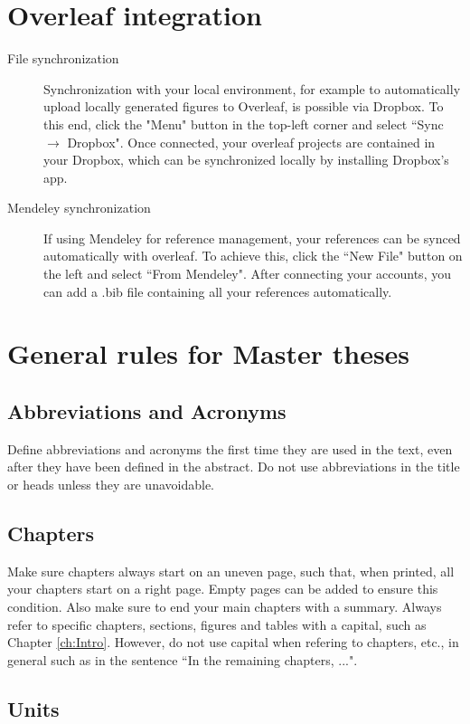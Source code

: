 \documentclass[11pt]{report}
\numberwithin{equation}{chapter}		%
\numberwithin{figure}{chapter}			%
\numberwithin{table}{chapter}			%
\begin{document}
	\section{Overleaf integration}
	\begin{description}
	\item[File synchronization] Synchronization with your local environment, for example to automatically upload locally generated figures to Overleaf, is possible via Dropbox. To this end, click the "Menu" button in the top-left corner and select ``Sync $\rightarrow$ Dropbox". Once connected, your overleaf projects are contained in your Dropbox, which can be synchronized locally by installing Dropbox's app.
	\item[Mendeley synchronization] If using Mendeley for reference management, your references can be synced automatically with overleaf. To achieve this, click the ``New File" button on the left and select ``From Mendeley". After connecting your accounts, you can add a .bib file containing all your references automatically.
	\end{description}


	\section{General rules for Master theses}
	\subsection{Abbreviations and Acronyms} Define abbreviations and acronyms the first time they are used in the text, even after they have been defined in the abstract. Do not use abbreviations in the title or heads unless they are unavoidable.

	\subsection{Chapters}
	Make sure chapters always start on an uneven page, such that, when printed, all your chapters start on a right page. Empty pages can be added to ensure this condition. Also make sure to end your main chapters with a summary. Always refer to specific chapters, sections, figures and tables with a capital, such as Chapter \ref{ch:Intro}. However, do not use capital when refering to chapters, etc., in general such as in the sentence ``In the remaining chapters, ...".

	\subsection{Units}
\end{document}
